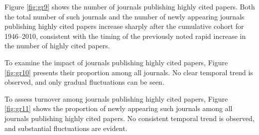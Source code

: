 Figure \ref{fig:gr9} shows the number of journals publishing highly cited papers. Both the total number of such journals and the number of newly appearing journals publishing highly cited papers increase sharply after the cumulative cohort for 1946–2010, consistent with the timing of the previously noted rapid increase in the number of highly cited papers.

To examine the impact of journals publishing highly cited papers, Figure \ref{fig:gr10} presents their proportion among all journals. No clear temporal trend is observed, and only gradual fluctuations can be seen.

To assess turnover among journals publishing highly cited papers, Figure \ref{fig:gr11} shows the proportion of newly appearing such journals among all journals publishing highly cited papers. No consistent temporal trend is observed, and substantial fluctuations are evident.
